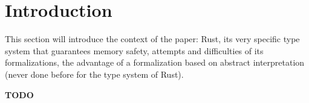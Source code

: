 \section{Introduction}\label{sec:introduction}

This section will introduce the context of the paper: Rust, its very
specific type system that guarantees memory safety, attempts and difficulties
of its formalizations, the advantage of a formalization based on abstract
interpretation (never done before for the type system of Rust).

\textbf{TODO}
